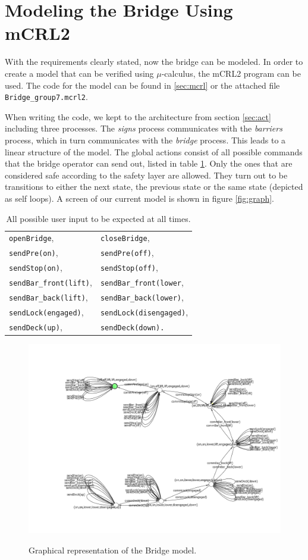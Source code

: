 \section{Modeling the Bridge Using mCRL2}

With the requirements clearly stated, now the bridge can be modeled. In order to create a model that can be verified using $\mu$-calculus, the mCRL2 program can be used. The code for the model can be found in \ref{sec:mcrl} or the attached file \texttt{Bridge\_group7.mcrl2}.

When writing the code, we kept to the architecture from section \ref{sec:act} including three processes. The \emph{signs} process communicates with the \emph{barriers} process, which in turn communicates with the \emph{bridge} process. This leads to a linear structure of the model. The global actions consist of all possible commands that the bridge operator can send out, listed in table \ref{tab:allow}. Only the ones that are considered safe according to the safety layer are allowed. They turn out to be transitions to either the next state, the previous state or the same state (depicted as self loops). A screen of our current model is shown in figure \ref{fig:graph}.
%
\begin{table}[htb]%
\begin{tabular}{ll}
	\texttt{openBridge},& \texttt{closeBridge},\\
	\texttt{sendPre(on)},& \texttt{sendPre(off)},\\
	\texttt{sendStop(on)},& \texttt{sendStop(off)},\\
	\texttt{sendBar\_front(lift)},& \texttt{sendBar\_front(lower},\\
	\texttt{sendBar\_back(lift)},& \texttt{sendBar\_back(lower)},\\
	\texttt{sendLock(engaged)},& \texttt{sendLock(disengaged)},\\
	\texttt{sendDeck(up)},& \texttt{sendDeck(down).}\\
\end{tabular}
\caption{All possible user input to be expected at all times.}
\label{tab:allow}
\end{table}
%
\begin{figure}[htb]
\centering
\includegraphics[width=\columnwidth]{Images/Bridge_allow_ltsgraph.png}
\label{fig:graph}
\caption{Graphical representation of the Bridge model.}%
\label{}%
\end{figure}%
%

\newpage